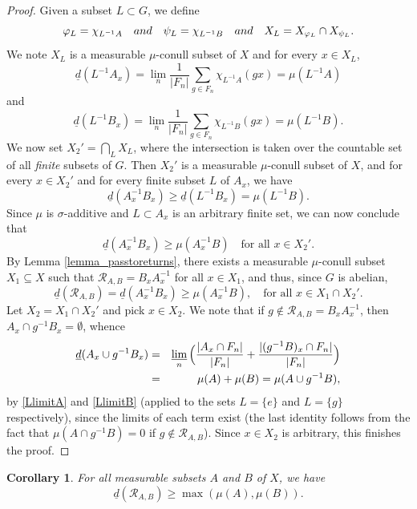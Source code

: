 \documentclass[11pt]{article}
\numberwithin{equation}{section}
\let\mathcal\mathscr
\newcommand{\cR}{\mathcal{R}}
\newcommand{\qand}{\quad\textup{and}\quad}
\theoremstyle{plain}
\newtheorem{corollary}[theorem]{Corollary}
\theoremstyle{definition}
\begin{document}
\begin{proof}
Given a subset $L \subset G$, we define
\[
\varphi_L = \chi_{L^{-1}A} \qand \psi_L = \chi_{L^{-1}B} \qand X_L = X_{\varphi_L} \cap X_{\psi_L}.
\]
We note $X_L$ is a measurable $\mu$-conull subset of $X$ and for every $x \in X_L$,
\begin{equation}
\label{LlimitA}
\underline{d}(L^{-1}A_x) = \lim_n \frac{1}{|F_n|} \sum_{g \in F_n} \chi_{L^{-1}A}(gx) = \mu(L^{-1}A)
\end{equation}
and
\begin{equation}
\label{LlimitB}
\underline{d}(L^{-1}B_x) = \lim_n \frac{1}{|F_n|} \sum_{g \in F_n} \chi_{L^{-1}B}(gx) = \mu(L^{-1}B).
\end{equation}
We now set $X_2' = \bigcap_{L} X_L$, where the intersection is taken over the countable set of all \emph{finite} subsets of $G$. Then
$X_2'$ is a measurable $\mu$-conull subset of $X$, and for every $x \in X_2'$ and for every finite subset $L$ of $A_x$, we have
\[
\underline{d}(A_x^{-1}B_x) \geq \underline{d}(L^{-1}B_x) = \mu(L^{-1}B).
\]
Since $\mu$ is $\sigma$-additive and $L \subset A_x$ is an arbitrary finite set, we can now conclude that
\[
\underline{d}(A_x^{-1}B_x) \geq \mu(A_x^{-1}B) \quad \textrm{for all $x \in X_2'$}.
\]
By Lemma \ref{lemma_passtoreturns}, there exists a measurable $\mu$-conull subset $X_1 \subseteq X$ such that
$\cR_{A,B} = B_x A_x^{-1}$ for all $x \in X_1$, and thus, since $G$ is abelian,
\[
\underline{d}(\cR_{A,B}) = \underline{d}(A_x^{-1}B_x) \geq \mu(A_x^{-1}B), \quad \textrm{for all $x \in X_1 \cap X_2'$}.
\]
Let $X_2 = X_1 \cap X_2'$ and pick $x \in X_2$. We note that if $g \notin \cR_{A,B} = B_x A_x^{-1}$, then $A_x \cap g^{-1}B_x = \emptyset$,
whence
\begin{eqnarray*}
\underline{d}(A_x \cup g^{-1}B_x)
&=&
\varliminf_n \Big( \frac{|A_x \cap F_n|}{|F_n|} + \frac{|(g^{-1}B)_x \cap F_n|}{|F_n|} \Big) \\
&=&
\mu(A) + \mu(B) = \mu(A \cup g^{-1}B),
\end{eqnarray*}
by \eqref{LlimitA} and \eqref{LlimitB} (applied to the sets $L = \{e\}$ and $L = \{g\}$ respectively), since the limits of each term exist
(the last identity follows from the fact that $\mu(A \cap g^{-1}B) = 0$ if $g \notin \cR_{A,B}$). Since $x \in X_2$ is arbitrary, this finishes the proof.
\end{proof}

\begin{corollary}
\label{cor_max}
For all measurable subsets $A$ and $B$ of $X$, we have
\[
\underline{d}(\cR_{A,B}) \geq \max(\mu(A),\mu(B)).
\]
\end{corollary}
\end{document}
